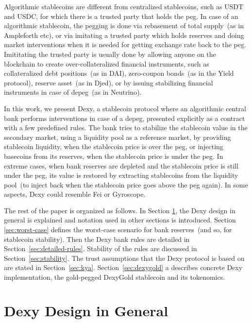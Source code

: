 \documentclass[a4paper,UKenglish,cleveref, autoref, thm-restate]{lipics-v2021}
\newcommand{\dx}{Dexy}
\begin{document}
Algorithmic stablecoins are different from centralized stablecoins, such as USDT and USDC, for which there is a trusted party that holds the peg. In case of an algorithmic stablecoin, the 
pegging is done via rebasement of total supply~(as in Ampleforth etc), or via imitating a trusted party which holds reserves and doing market interventions when it is needed for getting exchange rate back to the peg. Imititating the trusted party is usually done by allowing anyone on the blockchain to create over-collateralized financial instruments, such as collateralized debt positions~(as 
in DAI), zero-coupon bonds~(as in the Yield protocol), reserve asset~(as in Djed), or by issuing stabilizing financial instruments in case of depeg~(as in Neutrino).

In this work, we present \dx{}, a stablecoin protocol where an algorithmic central bank performs interventions in case of a depeg, presented explicitly as a contract with a few predefined rules. The bank tries to stabilize the stablecoin value in the secondary market, using a liquidity pool as a reference market, by providing stablecoin liquidity, when the stablecoin price is over the peg, or injecting basecoins from its reserves, when the stablecoin price is under the peg. In extreme cases, when bank reserves are depleted and the stablecoin price is still under the peg, its value is restored by extracting stablecoins from the liquidity pool~(to inject back when the stablecoin price goes above the peg again). In some aspects, \dx{} could resemble Fei or Gyroscope. 

The rest of the paper is organized as follows.  In Section \ref{sec:design-general}, the \dx{} design in general is explained and
notation used in other sections is introduced. Section \ref{sec:worst-case} defines the worst-case scenario for bank reserves~(and so, for stablecoin stability). Then the \dx{} bank rules are detailed in Section~\ref{sec:detailed-rules}. Stability of the rules are
discussed in Section~\ref{sec:stability}. The trust assumptions that the \dx{} protocol is based on are stated in Section~\ref{sec:kya}.
Section~\ref{sec:dexygold} a describes concrete \dx{} implementation, the gold-pegged DexyGold stablecoin and its
tokenomics.

\section{\dx{} Design in General}
\label{sec:design-general}
\end{document}

